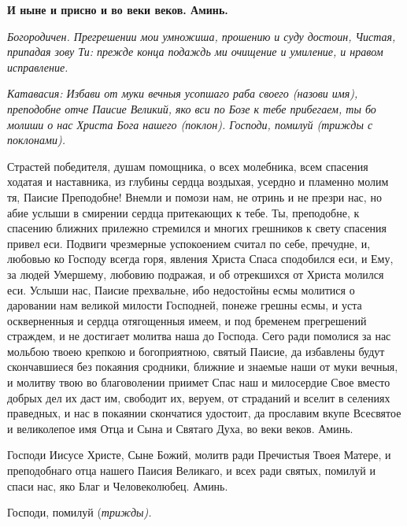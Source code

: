 \bfseries И ныне и присно и во веки веков. Аминь.\normalfont{}




\itshape Богородичен.\normalfont{} Прегрешении мои умножиша, прошению и суду достоин, Чистая, припадая зову Ти: прежде конца подаждь ми очищение и умиление, и нравом исправление.




\itshape Катавасия:\normalfont{} Избави от муки вечныя усопшаго раба своего (\itshape назови имя\normalfont{}), преподобне отче Паисие Великий, яко вси по Бозе к тебе прибегаем, ты бо молиши о нас Христа Бога нашего (\itshape поклон\normalfont{}). Господи, помилуй (\itshape трижды с поклонами\normalfont{}). 










Страстей победителя, душам помощника, о всех молебника, всем спасения ходатая и наставника, из глубины сердца воздыхая, усердно и пламенно молим тя, Паисие Преподобне! Внемли и помози нам, не отринь и не презри нас, но абие услыши в смирении сердца притекающих к тебе. Ты, преподобне, к спасению ближних прилежно стремился и многих грешников к свету спасения привел еси. Подвиги чрезмерные успокоением считал по себе, пречудне, и, любовью ко Господу всегда горя, явления Христа Спаса сподобился еси, и Ему, за людей Умершему, любовию подражая, и об отрекшихся от Христа молился еси. Услыши нас, Паисие прехвальне, ибо недостойны есмы молитися о даровании нам великой милости Господней, понеже грешны есмы, и уста оскверненныя и сердца отягощенныя имеем, и под бременем прегрешений страждем, и не достигает молитва наша до Господа. Сего ради помолися за нас мольбою твоею крепкою и богоприятною, святый Паисие, да избавлены будут скончавшиеся без покаяния сродники, ближние и знаемые наши от муки вечныя, и молитву твою во благоволении приимет Спас наш и милосердие Свое вместо добрых дел их даст им, свободит их, веруем, от страданий и вселит в селениях праведных, и нас в покаянии скончатися удостоит, да прославим вкупе Всесвятое и великолепое имя Отца и Сына и Святаго Духа, во веки веков. Аминь. 





Господи Иисусе Христе, Сыне Божий, молитв ради Пречистыя Твоея Матере, и преподобнаго отца нашего Паисия Великаго, и всех ради святых, помилуй и спаси нас, яко Благ и Человеколюбец. Аминь. 


Господи, помилуй (\itshape трижды\normalfont{}). 
